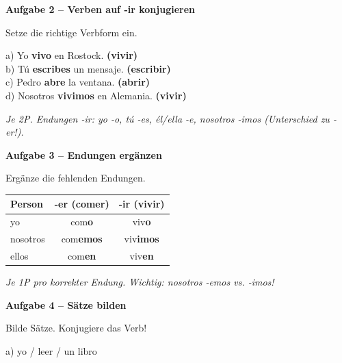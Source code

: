 \documentclass[11pt, a4paper]{article}
\newcommand{\fachfarbe}{spanisch}
\newcommand{\punktebox}[1]{\hfill\fbox{\small \_/#1}}
\newcommand{\lsg}[1]{\textcolor{loesung}{\textbf{#1}}}
\newenvironment{aufgabe}[1]{%
    \needspace{5\baselineskip}%
    \nopagebreak[4]%
    \vspace{10pt}
    \noindent\textbf{\textcolor{\fachfarbe}{Aufgabe #1}}
    \nopagebreak[4]%
    \vspace{5pt}
    \nopagebreak[4]%
    \begin{list}{}{\leftmargin=0pt}
    \item[]
}{%
    \end{list}
}
\newcommand{\er}[1]{\textcolor{erfarbe}{\textbf{#1}}}
\newcommand{\ir}[1]{\textcolor{irfarbe}{\textbf{#1}}}
\begin{document}
\begin{aufgabe}{2 -- Verben auf \ir{-ir} konjugieren}
Setze die richtige Verbform ein. \punktebox{8}
\end{aufgabe}

\noindent
a) Yo \lsg{vivo} en Rostock. \ir{(vivir)}\\[1em]
b) Tú \lsg{escribes} un mensaje. \ir{(escribir)}\\[1em]
c) Pedro \lsg{abre} la ventana. \ir{(abrir)}\\[1em]
d) Nosotros \lsg{vivimos} en Alemania. \ir{(vivir)}

\textit{\textcolor{grau}{Je 2P. Endungen -ir: yo -o, tú -es, él/ella -e, nosotros -imos (Unterschied zu -er!).}}

\vspace{15pt}


\begin{aufgabe}{3 -- Endungen ergänzen}
Ergänze die fehlenden Endungen. \punktebox{6}
\end{aufgabe}

\begin{center}
\begin{tabular}{|l|c|c|}
\hline
\textbf{Person} & \er{-er (comer)} & \ir{-ir (vivir)} \\
\hline
yo & com\lsg{o} & viv\lsg{o} \\[0.8em]
\hline
nosotros & com\lsg{emos} & viv\lsg{imos} \\[0.8em]
\hline
ellos & com\lsg{en} & viv\lsg{en} \\[0.8em]
\hline
\end{tabular}
\end{center}

\textit{\textcolor{grau}{Je 1P pro korrekter Endung. Wichtig: nosotros -emos vs. -imos!}}

\vspace{15pt}


\begin{aufgabe}{4 -- Sätze bilden}
Bilde Sätze. Konjugiere das Verb! \punktebox{6}
\end{aufgabe}

\noindent
a) yo / leer / un libro
\end{document}
